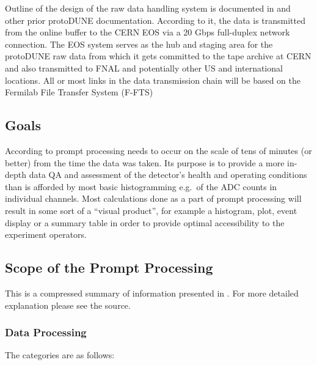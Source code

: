 \documentclass[pdftex,12pt,letter]{article}
\newcommand{\pd}{protoDUNE\xspace}
\begin{document}
Outline of the design of the raw data handling system is documented in  \cite{docdb1212} and other prior \pd documentation.
According to it, the data is transmitted from the online buffer to the CERN EOS \cite{eos} via a 20 Gbps full-duplex network connection.
The EOS system serves as the hub and staging area for the \pd raw data from which it gets committed to the tape archive at CERN and also transmitted to FNAL and potentially other US and international locations. All or most links in the data transmission chain will be based on the  Fermilab File Transfer System (F-FTS) \cite{fts}
 
\subsection{Goals}
\label{sec:outline}

According to \cite{docdb1811}  prompt processing needs to occur on the scale
of tens of minutes (or better) from the time the data was taken. Its purpose is to
provide a more in-depth data QA and assessment of the detector's health and operating conditions
than is afforded by most basic histogramming e.g.~of the ADC counts in individual channels. Most calculations
done as a part of prompt processing will result in some sort of a ``visual product'', for example a histogram,
plot, event display or a summary table in order to provide optimal accessibility to the experiment
operators.

\subsection{Scope of the Prompt Processing}
This is a compressed summary of information presented in \cite{docdb1811}.
For more detailed explanation please see the source.

\subsubsection{Data Processing}
\label{sec:categories}
The categories are as follows:
\end{document}
